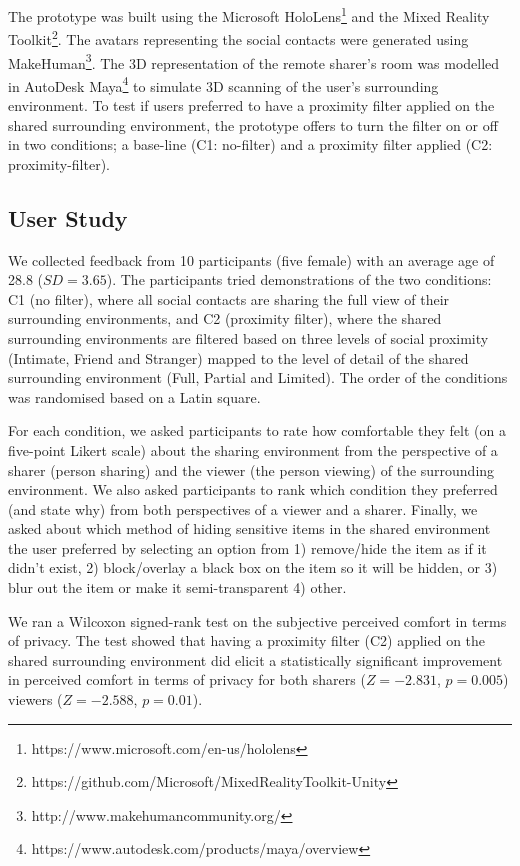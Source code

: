 The prototype was built using the Microsoft HoloLens\footnote{https://www.microsoft.com/en-us/hololens} and the Mixed Reality Toolkit\footnote{https://github.com/Microsoft/MixedRealityToolkit-Unity}. The avatars representing the social contacts were generated using MakeHuman\footnote{http://www.makehumancommunity.org/}. The 3D representation of the remote sharer's room was modelled in AutoDesk Maya\footnote{https://www.autodesk.com/products/maya/overview} to simulate 3D scanning of the user's surrounding environment. To test if users preferred to have a proximity filter applied on the shared surrounding environment, the prototype offers to turn the filter on or off in two conditions; a base-line (C1: no-filter) and a proximity filter applied (C2: proximity-filter).


\subsection{User Study}

We collected feedback from 10 participants (five female) with an average age of 28.8 ($SD=3.65$). The participants tried demonstrations of the two conditions: C1 (no filter), where all social contacts are sharing the full view of their surrounding environments, and C2 (proximity filter), where the shared surrounding environments are filtered based on three levels of social proximity (Intimate, Friend and Stranger) mapped to the level of detail of the shared surrounding environment (Full, Partial and Limited). The order of the conditions was randomised based on a Latin square. 

For each condition, we asked participants to rate how comfortable they felt (on a five-point Likert scale) about the sharing environment from the perspective of a sharer (person sharing) and the viewer (the person viewing) of the surrounding environment. We also asked participants to rank which condition they preferred (and state why) from both perspectives of a viewer and a sharer. Finally, we asked about which method of hiding sensitive items in the shared environment the user preferred by selecting an option from 1) remove/hide the item as if it didn't exist, 2) block/overlay a black box on the item so it will be hidden, or 3) blur out the item or make it semi-transparent 4) other. 

We ran a Wilcoxon signed-rank test on the subjective perceived comfort in terms of privacy. The test showed that having a proximity filter (C2) applied on the shared surrounding environment did elicit a statistically significant improvement in perceived comfort in terms of privacy for both sharers ($Z=-2.831$, $p=0.005$) viewers ($Z=-2.588$, $p=0.01$). 

